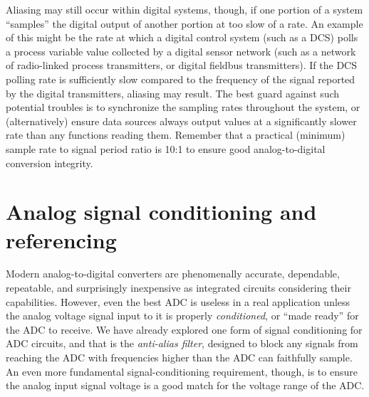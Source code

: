 Aliasing may still occur within digital systems, though, if one portion of a system ``samples'' the digital output of another portion at too slow of a rate.  An example of this might be the rate at which a digital control system (such as a DCS) polls a process variable value collected by a digital sensor network (such as a network of radio-linked process transmitters, or digital fieldbus transmitters).  If the DCS polling rate is sufficiently slow compared to the frequency of the signal reported by the digital transmitters, aliasing may result.  The best guard against such potential troubles is to synchronize the sampling rates throughout the system, or (alternatively) ensure data sources always output values at a significantly slower rate than any functions reading them.  Remember that a practical (minimum) sample rate to signal period ratio is 10:1 to ensure good analog-to-digital conversion integrity.















\filbreak
\section{Analog signal conditioning and referencing}

Modern analog-to-digital converters are phenomenally accurate, dependable, repeatable, and surprisingly inexpensive as integrated circuits considering their capabilities.  However, even the best ADC is useless in a real application unless the analog voltage signal input to it is properly \textit{conditioned}, or ``made ready'' for the ADC to receive.  We have already explored one form of signal conditioning for ADC circuits, and that is the \textit{anti-alias filter}, designed to block any signals from reaching the ADC with frequencies higher than the ADC can faithfully sample.  An even more fundamental signal-conditioning requirement, though, is to ensure the analog input signal voltage is a good match for the voltage range of the ADC.


